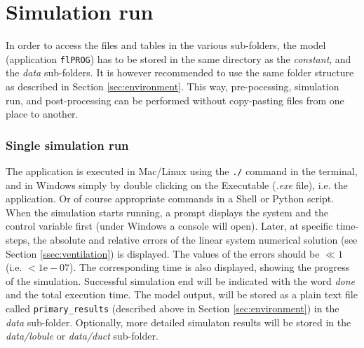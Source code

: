 \section{Simulation run} \label{sec:simulation_run}
In order to access the files and tables in the various sub-folders, the model (application \texttt{flPROG}) has to be stored in the same directory as the \textit{constant}, and the \textit{data} sub-folders.
It is however recommended to use the same folder structure as described in Section \ref{sec:environment}.
This way, pre-pocessing, simulation run, and post-processing can be performed without copy-pasting files from one place to another.

\subsubsection{Single simulation run}
The application is executed in Mac/Linux using the \texttt{./} command in the terminal, and in Windows simply by double clicking on the Executable (\textit{.exe} file), i.e. the application.
Or of course appropriate commands in a Shell or Python script.
When the simulation starts running, a prompt displays the system and the control variable first (under Windows a console will open).
Later, at specific time-steps, the absolute and relative errors of the linear system numerical solution (see Section \ref{ssec:ventilation}) is displayed.
The values of the errors should be $\ll 1$ (i.e. $<1\mathrm{e}-07$).
The corresponding time is also displayed, showing the progress of the simulation.
Successful simulation end will be indicated with the word \textit{done} and the total execution time.
The model output, will be stored as a plain text file called \texttt{primary\_results} (described above in Section \ref{sec:environment}) in the \textit{data} sub-folder.
Optionally, more detailed simulaton results will be stored in the \textit{data/lobule} or \textit{data/duct} sub-folder.


